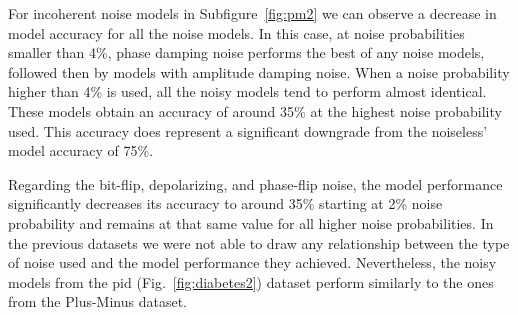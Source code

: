 For incoherent noise models in Subfigure~\ref{fig:pm2}
we can observe a decrease in model accuracy for all the noise
models. In this case, at noise probabilities smaller than 4\%,
phase damping noise performs the best of any noise models,
followed then by models with amplitude damping noise. When
a noise probability higher than 4\% is used, all the
noisy models tend to perform almost identical. These
models obtain an accuracy of around 35\% at the highest
noise probability used. This accuracy does represent
a significant downgrade from the noiseless' model
accuracy of 75\%. \

Regarding the bit-flip, depolarizing, and phase-flip noise, the model
performance significantly decreases its accuracy to around 35\% starting at
2\% noise probability and remains at that same value for all
higher noise probabilities. In the previous datasets we were not able
to draw any relationship between the type of noise used and the model
performance they achieved. Nevertheless, the noisy models from the
\ac{pid} (Fig.~\ref{fig:diabetes2}) dataset perform similarly to the
ones from the Plus-Minus dataset. \

